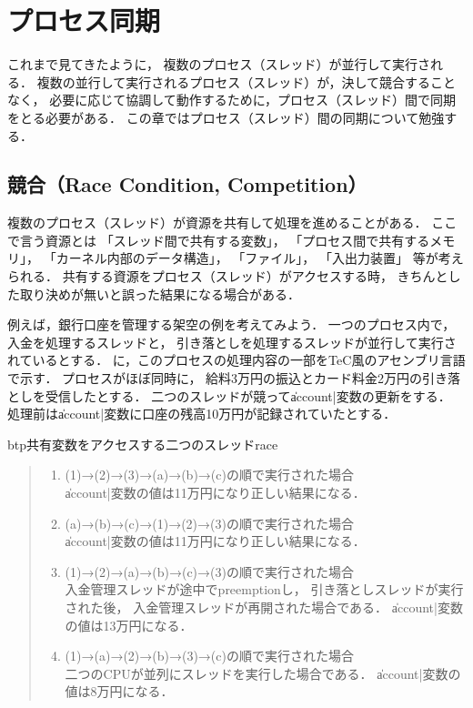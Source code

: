 \chapter{プロセス同期}
\label{synchronaization}
これまで見てきたように，
複数のプロセス（スレッド）が並行して実行される．
複数の並行して実行されるプロセス（スレッド）が，決して競合することなく，
必要に応じて協調して動作するために，プロセス（スレッド）間で同期をとる必要がある．
この章ではプロセス（スレッド）間の同期について勉強する．

\section{競合（Race Condition, Competition）}
複数のプロセス（スレッド）が資源を共有して処理を進めることがある．
ここで言う資源とは
「スレッド間で共有する変数」，
「プロセス間で共有するメモリ」，
「カーネル内部のデータ構造」，
「ファイル」，
「入出力装置」
等が考えられる．
共有する資源をプロセス（スレッド）がアクセスする時，
きちんとした取り決めが無いと誤った結果になる場合がある．

例えば，銀行口座を管理する架空の例を考えてみよう．
一つのプロセス内で，入金を処理するスレッドと，
引き落としを処理するスレッドが並行して実行されているとする．
に，このプロセスの処理内容の一部をTeC風のアセンブリ言語で示す．
プロセスがほぼ同時に，
給料3万円の振込とカード料金2万円の引き落としを受信したとする．
二つのスレッドが競って\|account|変数の更新をする．
処理前は\|account|変数に口座の残高10万円が記録されていたとする．

\begin{myfig}{btp}{共有変数をアクセスする二つのスレッド}{race}
  
\end{myfig}

\begin{quote}
  \begin{enumerate}
  \item (1)→(2)→(3)→(a)→(b)→(c)の順で実行された場合 \\
    \|account|変数の値は11万円になり正しい結果になる．

  \item (a)→(b)→(c)→(1)→(2)→(3)の順で実行された場合 \\
    \|account|変数の値は11万円になり正しい結果になる．

  \item (1)→(2)→(a)→(b)→(c)→(3)の順で実行された場合 \\
    入金管理スレッドが途中でpreemptionし，
    引き落としスレッドが実行された後，
    入金管理スレッドが再開された場合である．
    \|account|変数の値は13万円になる．

  \item (1)→(a)→(2)→(b)→(3)→(c)の順で実行された場合 \\
    二つのCPUが並列にスレッドを実行した場合である．
    \|account|変数の値は8万円になる．
  \end{enumerate}
\end{quote}

